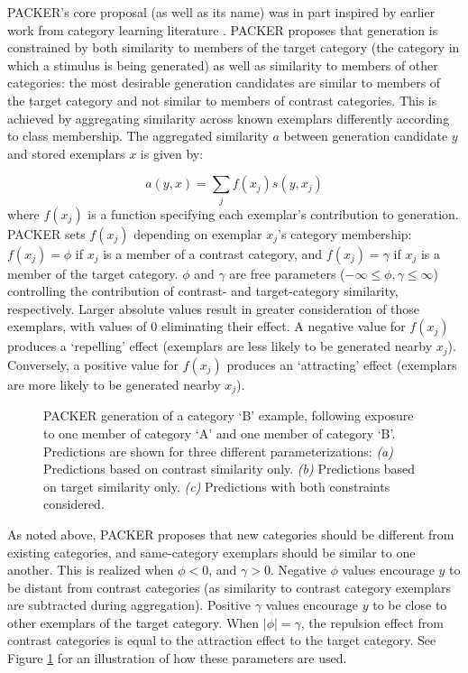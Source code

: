 \documentclass[12pt]{article}
\newcommand\inputpgf[2]{{
\let\pgfimageWithoutPath\pgfimage
\renewcommand{\pgfimage}[2][]{\pgfimageWithoutPath[##1]{#1/##2}}

}}
\begin{document}
\begin{flushleft}
PACKER's core proposal (as well as its name) was in part inspired by earlier work from category learning literature \citep[see][]{hidaka2011packing}. PACKER proposes that generation is constrained by both similarity to members of the target category (the category in which a stimulus is being generated) as well as similarity to members of other categories: the most desirable generation candidates are similar to members of the target category and not similar to members of contrast categories. This is achieved by aggregating similarity across known exemplars differently according to class membership. The aggregated similarity $a$ between generation candidate $y$ and stored exemplars $x$ is given by:

\begin{equation}
a(y, x) = \sum_j{f(x_j) s(y, x_j)}
\end{equation}
% 
where $f(x_j)$ is a function specifying each exemplar's contribution to generation. PACKER sets $f(x_j)$ depending on exemplar $x_j$'s category membership: $f(x_j) = \phi$ if $x_j$ is a member of a contrast category, and $f(x_j) = \gamma$ if $x_j$ is a member of the target category. $\phi$ and $\gamma$ are free parameters ($-\infty \leq \phi, \gamma \leq \infty$) controlling the contribution of contrast- and target-category similarity, respectively. Larger absolute values result in greater consideration of those exemplars, with values of 0 eliminating their effect. A negative value for $f(x_j)$ produces a `repelling' effect (exemplars are less likely to be generated nearby $x_j$). Conversely, a positive value for $f(x_j)$ produces an `attracting' effect (exemplars are more likely to be generated nearby $x_j$). 

\begin{figure}
	\begin{center}
		\inputpgf{figs/}{packer-examples.pgf}
		\caption{PACKER generation of a category `B' example, following exposure to one member of category `A' and one member of category `B'. Predictions are shown for three different parameterizations: \textit{(a)} Predictions based on contrast similarity only. \textit{(b)} Predictions based on target similarity only.  \textit{(c)} Predictions with both constraints considered.}
		\label{fig:packer-examples}
	\end{center}
\end{figure}

As noted above, PACKER proposes that new categories should be different from existing categories, and same-category exemplars should be similar to one another. This is realized when $\phi < 0$, and $\gamma > 0$. Negative $\phi$ values encourage $y$ to be distant from contrast categories (as similarity to contrast category exemplars are subtracted during aggregation). Positive $\gamma$ values encourage $y$ to be close to other exemplars of the target category. When $|\phi| = \gamma$, the repulsion effect from contrast categories is equal to the attraction effect to the target category. See Figure \ref{fig:packer-examples} for an illustration of how these parameters are used.


\end{flushleft}
\end{document}
